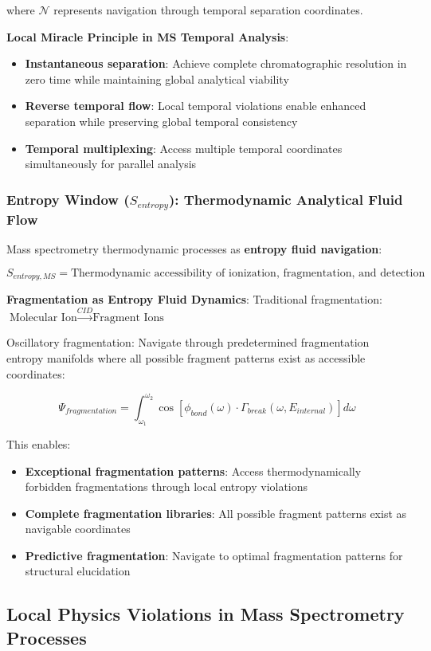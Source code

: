 \documentclass[11pt,a4paper]{article}
\theoremstyle{remark}
\begin{document}
where $\mathcal{N}$ represents navigation through temporal separation coordinates.

\textbf{Local Miracle Principle in MS Temporal Analysis}:
\begin{itemize}
\item \textbf{Instantaneous separation}: Achieve complete chromatographic resolution in zero time while maintaining global analytical viability
\item \textbf{Reverse temporal flow}: Local temporal violations enable enhanced separation while preserving global temporal consistency
\item \textbf{Temporal multiplexing}: Access multiple temporal coordinates simultaneously for parallel analysis
\end{itemize}

\subsubsection{Entropy Window ($S_{entropy}$): Thermodynamic Analytical Fluid Flow}

Mass spectrometry thermodynamic processes as \textbf{entropy fluid navigation}:

$$S_{entropy,MS} = \text{Thermodynamic accessibility of ionization, fragmentation, and detection pathways}$$

\textbf{Fragmentation as Entropy Fluid Dynamics}:
Traditional fragmentation: $\text{Molecular Ion} \xrightarrow{CID} \text{Fragment Ions}$

Oscillatory fragmentation: Navigate through predetermined fragmentation entropy manifolds where all possible fragment patterns exist as accessible coordinates:

$$\Psi_{fragmentation} = \int_{\omega_1}^{\omega_2} \cos[\phi_{bond}(\omega) \cdot \Gamma_{break}(\omega, E_{internal})] d\omega$$

This enables:
\begin{itemize}
\item \textbf{Exceptional fragmentation patterns}: Access thermodynamically forbidden fragmentations through local entropy violations
\item \textbf{Complete fragmentation libraries}: All possible fragment patterns exist as navigable coordinates  
\item \textbf{Predictive fragmentation}: Navigate to optimal fragmentation patterns for structural elucidation
\end{itemize}

\subsection{Local Physics Violations in Mass Spectrometry Processes}
\end{document}
